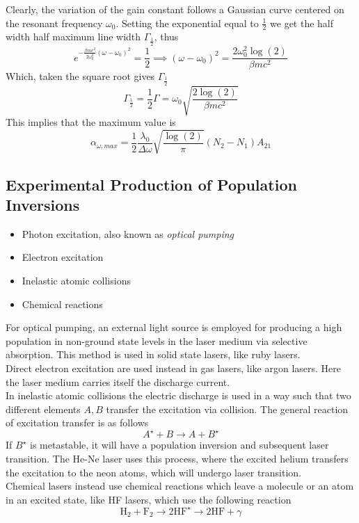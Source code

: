 \documentclass[../electromagnetism.tex]{subfiles}
\begin{document}
Clearly, the variation of the gain constant follows a Gaussian curve centered on the resonant frequency $\omega_0$. Setting the exponential equal to $\frac{1}{2}$ we get the half width half maximum line width $\Gamma_{\frac{1}{2}}$, thus
\begin{equation*}
	e^{-\frac{\beta mc^2}{2\omega_0^2}(\omega-\omega_0)^2}=\frac{1}{2}\implies\left( \omega-\omega_0 \right)^2=\frac{2\omega_0^2\log(2)}{\beta mc^2}
\end{equation*}
Which, taken the square root gives $\Gamma_{\frac{1}{2}}$
\begin{equation}
	\Gamma_{\frac{1}{2}}=\frac{1}{2}\Gamma=\omega_0\sqrt{\frac{2\log(2)}{\beta mc^2}}
	\label{eq:linewidthalpha.se}
\end{equation}
This implies that the maximum value is
\begin{equation}
	\alpha_{\omega, max}=\frac{1}{2}\frac{\lambda_0}{\Delta\omega}\sqrt{\frac{\log(2)}{\pi}}\left( N_2-N_1 \right)A_{21}
	\label{eq:maxgaindoppler.se}
\end{equation}
\subsection{Experimental Production of Population Inversions}
\begin{itemize}
\item Photon excitation, also known as \textit{optical pumping}
\item Electron excitation
\item Inelastic atomic collisions
\item Chemical reactions
\end{itemize}
For optical pumping, an external light source is employed for producing a high population in non-ground state levels in the laser medium via selective absorption. This method is used in solid state lasers, like ruby lasers.\\
Direct electron excitation are used instead in gas lasers, like argon lasers. Here the laser medium carries itself the discharge current.\\
In inelastic atomic collisions the electric discharge is used in a way such that two different elements $A, B$ transfer the excitation via collision. The general reaction of excitation transfer is as follows
\begin{equation*}
	A^\star+B\to A+B^\star
\end{equation*}
If $B^\star$ is metastable, it will have a population inversion and subsequent laser transition. The He-Ne laser uses this process, where the excited helium transfers the excitation to the neon atoms, which will undergo laser transition.\\
Chemical lasers instead use chemical reactions which leave a molecule or an atom in an excited state, like HF lasers, which use the following reaction
\begin{equation}
	\mathrm{H}_2+\mathrm{F}_2\to2\mathrm{HF}^{\star}\to2\mathrm{HF}+\gamma
	\label{eq:hflasertrans.pi}
\end{equation}
\end{document}
